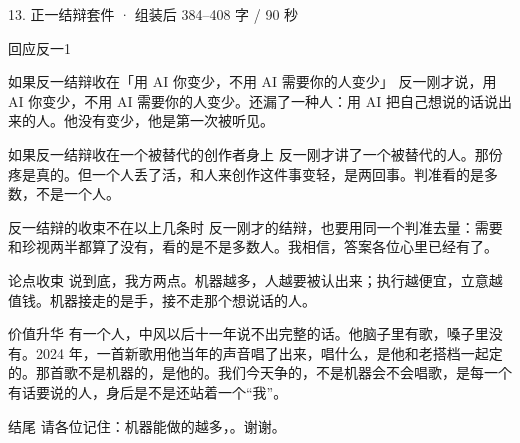 \documentclass[script,pro]{debate}
\begin{document}
\begin{kit}{13. 正一结辩}{套件 · 组装后 384–408 字 / 90 秒}
\begin{pick}{回应反一}{1}
\begin{module}{如果反一结辩收在「用 AI 你变少，不用 AI 需要你的人变少」}
反一刚才说，用 AI 你变少，不用 AI 需要你的人变少。还漏了一种人：用 AI 把自己想说的话说出来的人。他没有变少，他是第一次被听见。
\end{module}
\begin{module}{如果反一结辩收在一个被替代的创作者身上}
反一刚才讲了一个被替代的人。那份疼是真的。但一个人丢了活，和人来创作这件事变轻，是两回事。判准看的是多数，不是一个人。
\end{module}
\begin{fallback}{反一结辩的收束不在以上几条时}
反一刚才的结辩，也要用同一个判准去量：需要和珍视两半都算了没有，看的是不是多数人。我相信，答案各位心里已经有了。
\end{fallback}
\end{pick}
\begin{fixed}{论点收束}
说到底，我方两点。机器越多，人越要被认出来；执行越便宜，立意越值钱。机器接走的是手，接不走那个想说话的人。
\end{fixed}
\begin{fixed}{价值升华}
有一个人，中风以后十一年说不出完整的话。他脑子里有歌，嗓子里没有。2024 年，一首新歌用他当年的声音唱了出来，唱什么，是他和老搭档一起定的。那首歌不是机器的，是他的。我们今天争的，不是机器会不会唱歌，是每一个有话要说的人，身后是不是还站着一个“我”。
\end{fixed}
\begin{fixed}{结尾}
请各位记住：机器能做的越多，。谢谢。
\end{fixed}
\end{kit}
\begin{contingency}
\end{contingency}
\end{document}
